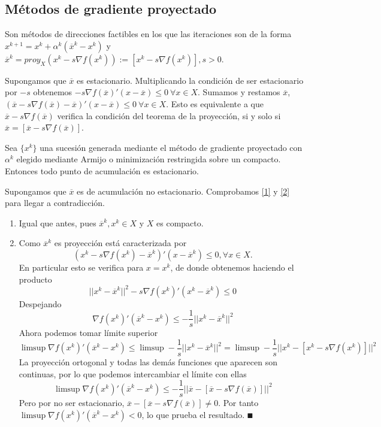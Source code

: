\documentclass[MIOP.tex]{subfiles}
\begin{document}
\subsection{Métodos de gradiente proyectado}
Son métodos de direcciones factibles en los que las iteraciones son de la forma $x^{k+1}=x^k+\alpha^k(\overline{x}^k-x^k)$ y $\overline{x}^k=proy_X(x^k-s\nabla f(x^k)):=[x^k-s\nabla f(x^k)], s>0$. 

Supongamos que $\overline{x}$ es estacionario. Multiplicando la condición de ser estacionario por $-s$ obtenemos $-s\nabla f(\overline{x})'(x-\overline{x})\leq 0\ \forall x\in X$. Sumamos y restamos $\overline{x}$, $(\overline{x}-s\nabla f(\overline{x})-\overline{x})'(x-\overline{x})\leq 0\ \forall x\in X$. Esto es equivalente a que $\overline{x}-s\nabla f(\overline{x})$ verifica la condición del teorema de la proyección, si y solo si $\overline{x}=[\overline{x}-s\nabla f(\overline{x})]$. 

\begin{teorema}
Sea $\{x^k\}$ una sucesión generada mediante el método de gradiente proyectado con $\alpha^k$ elegido mediante Armijo o minimización restringida sobre un compacto. Entonces todo punto de acumulación es estacionario.
\end{teorema}
\begin{dem}
Supongamos que $\overline{x}$ es de acumulación no estacionario. Comprobamos \ref{1} y \ref{2} para llegar a contradicción.
\begin{enumerate}
\item Igual que antes, pues $\overline{x}^k, x^k\in X$ y $X$ es compacto.
\item Como $\overline{x}^k$ es proyección está caracterizada por 
$$(x^k-s\nabla f(x^k)-\overline{x}^k)'(x-\overline{x}^k)\leq 0, \forall x\in X.$$
En particular esto se verifica para $x=x^k$, de donde obtenemos haciendo el producto
$$||x^k-\overline{x}^k||^2-s\nabla f(x^k)'(x^k-\overline{x}^k)\leq 0$$
Despejando
$$\nabla f(x^k)'(\overline{x}^k-x^k)\leq -\frac{1}{s}||x^k-\overline{x}^k||^2$$
Ahora podemos tomar límite superior
$$\limsup \nabla f(x^k)'(\overline{x}^k-x^k)\leq \limsup-\frac{1}{s}||x^k-\overline{x}^k||^2=\limsup-\frac{1}{s}||x^k-[x^k-s\nabla f(x^k)]||^2$$
La proyección ortogonal y todas las demás funciones que aparecen son continuas, por lo que podemos intercambiar el límite con ellas
$$\limsup \nabla f(x^k)'(\overline{x}^k-x^k)\leq -\frac{1}{s}||\overline{x}-[\overline{x}-s\nabla f(\overline{x})]||^2$$
Pero por no ser estacionario, $\overline{x}-[\overline{x}-s\nabla f(\overline{x})]\neq 0$. Por tanto $\limsup \nabla f(x^k)'(\overline{x}^k-x^k)<0$, lo que prueba el resultado. $\QED$
\end{enumerate}
\end{dem}
\end{document}
